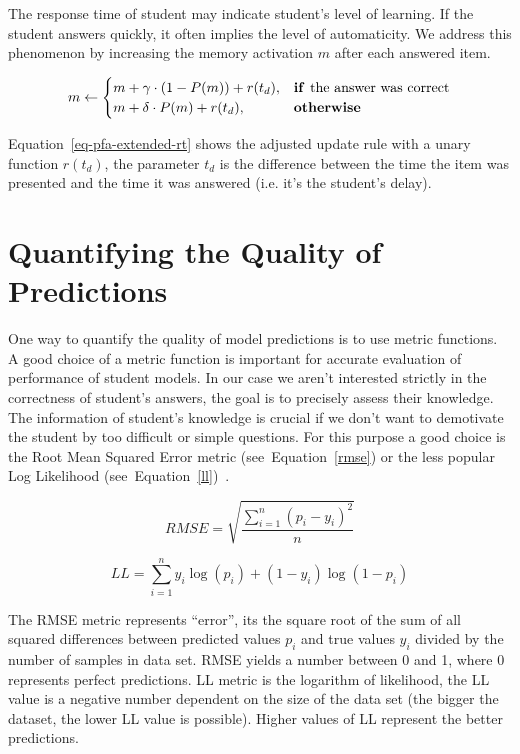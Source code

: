 The response time of student may indicate student's level of learning. If the student answers quickly, it often implies the level of automaticity. We address this phenomenon by increasing the memory activation $m$ after each answered item.

\begin{equation} \label{eq-pfa-extended-rt}
  m \gets \begin{cases}
            m + \gamma \cdot (1 - P(m)) + r(t_d), & \text{\textbf{if }} \text{the answer was correct} \\
            m + \delta \cdot P(m) + r(t_d), & \text{\textbf{otherwise}}
          \end{cases}
\end{equation}

Equation~\ref{eq-pfa-extended-rt} shows the adjusted update rule with a unary function $r(t_d)$, the parameter $t_d$ is the difference between the time the item was presented and the time it was answered (i.e. it's the student's delay).

\section{Quantifying the Quality of Predictions}

One way to quantify the quality of model predictions is to use metric functions. A good choice of a metric function is important for accurate evaluation of performance of student models. In our case we aren't interested strictly in the correctness of student's answers, the goal is to precisely assess their knowledge. The information of student's knowledge is crucial if we don't want to demotivate the student by too difficult or simple questions. For this purpose a good choice is the Root Mean Squared Error metric (see~Equation~\ref{rmse}) or the less popular Log Likelihood (see~Equation~\ref{ll})~\cite{Pelanek2015a}.

\begin{equation} \label{rmse}
  RMSE = \sqrt{\frac{\sum_{i=1}^n (p_i - y_i)^2}{n}}
\end{equation}

\begin{equation} \label{ll}
  LL = \sum_{i=1}^n y_i \log(p_i) + (1 - y_i) \log(1 - p_i)
\end{equation}

The RMSE metric represents ``error'', its the square root of the sum of all squared differences between predicted values $p_i$ and true values $y_i$ divided by the number of samples in data set. RMSE yields a number between 0 and 1, where 0 represents perfect predictions. LL metric is the logarithm of likelihood, the LL value is a negative number dependent on the size of the data set (the bigger the dataset, the lower LL value is possible). Higher values of LL represent the better predictions.

